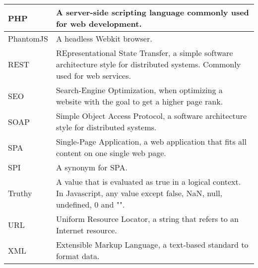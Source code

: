 \begin{table}[H]
\begin{center}
\begin{tabular}{ m{3cm} | m{11cm} }
			PHP				& A server-side scripting language commonly used for web development. \\ \hline
			PhantomJS		& A headless Webkit browser. \\ \hline
			REST			& REpresentational State Transfer, a simple software architecture style for distributed systems. Commonly used for web services. \\ \hline
			SEO				& Search-Engine Optimization, when optimizing a website with the goal to get a higher page rank. \\ \hline
			SOAP			& Simple Object Access Protocol, a software architecture style for distributed systems. \\ \hline
			SPA				& Single-Page Application, a web application that fits all content on one single web page. \\ \hline
			SPI				& A synonym for SPA. \\ \hline
			Truthy			& A value that is evaluated as true in a logical context. In Javascript, any value except false, NaN, null, undefined, 0 and "". \\ \hline
			URL				& Uniform Resource Locator, a string that refers to an Internet resource. \\ \hline
			XML				& Extensible Markup Language, a text-based standard to format data. \\ \hline
		\end{tabular}
	\end{center}
\end{table}
